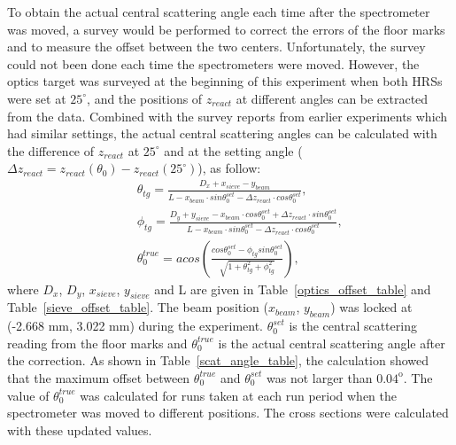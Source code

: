  To obtain the actual central scattering angle each time after the spectrometer was moved, a survey would be performed to correct the errors of the floor marks and to measure the offset between the two centers. Unfortunately, the survey could not been done each time the spectrometers were moved. However, the optics target was surveyed at the beginning of this experiment when both HRSs were set at $\mathrm{25^{\circ}}$, and the positions of $z_{react}$ at different angles can be extracted from the data. Combined with the survey reports from earlier experiments which had similar settings, the actual central scattering angles can be calculated with the difference of $z_{react}$ at $\mathrm{25^{\circ}}$ and at the setting angle ($\Delta z_{react}=z_{react}(\theta_{0})-z_{react}(25^{\circ})$), as follow: 
\begin{eqnarray}
 & &\theta_{tg} = \frac{D_{x}+x_{sieve}-y_{beam}}{L-x_{beam} \cdot sin\theta^{set}_{0}-\Delta z_{react} \cdot cos\theta^{set}_{0}},\\
 & &\phi_{tg}   = \frac{D_{y}+y_{sieve}-x_{beam} \cdot cos\theta^{set}_{0}+\Delta z_{react} \cdot sin\theta^{set}_{0}}{L-x_{beam} \cdot sin\theta^{set}_{0}-\Delta z_{react} \cdot cos\theta^{set}_{0}},\\
 & &\theta^{true}_{0} = acos\left( \frac{cos\theta^{set}_{0}-\phi_{tg}sin\theta^{set}_{0}}{\sqrt{1+\theta_{tg}^{2}+\phi_{tg}^{2}}} \right),
\end{eqnarray}
where $D_{x}$, $D_{y}$, $x_{sieve}$, $y_{sieve}$ and L are given in Table~\ref{optics_offset_table} and Table~\ref{sieve_offset_table}. The beam position ($x_{beam}$, $y_{beam}$) was locked at (-2.668 mm, 3.022 mm) during the experiment. $\theta^{set}_{0}$ is the central scattering reading from the floor marks and $\theta^{true}_{0}$ is the actual central scattering angle after the correction. As shown in Table~\ref{scat_angle_table}, the calculation showed that the maximum offset between $\theta^{true}_{0}$ and $\theta^{set}_{0}$ was not larger than $\mathrm{0.04^{o}}$. The value of $\theta^{true}_{0}$ was calculated for runs taken at each run period when the spectrometer was moved to different positions. The cross sections were calculated with these updated values.

